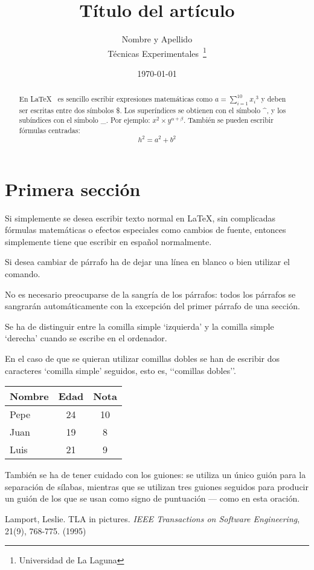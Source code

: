 \documentclass[a4paper,12pt]{article}
\begin{document}
\title{Título del artículo}
\author{Nombre y Apellido \\
Técnicas Experimentales~\footnote{Universidad de La Laguna}
}
\date{\today}
\maketitle
\begin{abstract}
En \LaTeX{}~\cite{Lam:86} es sencillo escribir expresiones
matemáticas como $a=\sum_{i=1}^{10} {x_i}^{3}$
y deben ser escritas entre dos símbolos \$.
Los superíndices se obtienen con el símbolo \^{}, y
los subíndices con el símbolo \_.
Por ejemplo: $x^2 \times y^{\alpha + \beta}$.
También se pueden escribir fórmulas centradas:
\[h^2=a^2 + b^2 \]
\end{abstract}

\section{Primera sección}
Si simplemente se desea escribir texto normal en LaTeX,
sin complicadas f\'ormulas matem\'aticas o efectos especiales
como cambios de fuente, entonces simplemente tiene que escribir
en espa\~nol normalmente.\par
Si desea cambiar de párrafo ha de dejar una línea en blanco o bien
utilizar el comando.

No es necesario preocuparse de la sangría de los párrafos:
todos los párrafos se sangrarán automáticamente con la excepción
del primer párrafo de una sección.

Se ha de distinguir entre la comilla simple ‘izquierda’
y la comilla simple ‘derecha’ cuando se escribe en el ordenador.

En el caso de que se quieran utilizar comillas dobles se han de
escribir dos caracteres ‘comilla simple’ seguidos, esto es,
‘‘comillas dobles’’.

\bigskip
\begin{tabular}{|l|c|c|}
\hline
Nombre & Edad & Nota \\ \hline
Pepe & 24 & 10 \\ \hline
Juan & 19 & 8 \\ \hline
Luis & 21 & 9 \\ \hline
\end{tabular}

También se ha de tener cuidado con los guiones: se utiliza un único
guión para la separación de sílabas, mientras que se utilizan
tres guiones seguidos para producir un guión de los que se usan
como signo de puntuación --- como en esta oración.
\begin{thebibliography}{00}
Lamport, Leslie.
TLA in pictures.
\emph{IEEE Transactions on Software Engineering},
21(9), 768-775.
(1995)
\end{thebibliography}
\end{document}
